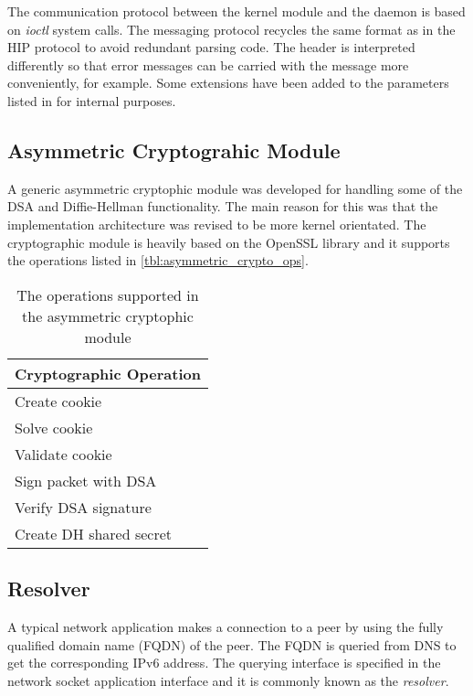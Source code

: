 The communication protocol between the kernel module and the daemon is
based on \textit{ioctl} system calls. The messaging protocol recycles
the same format as in the HIP protocol \cite{hip} to avoid redundant
parsing code. The header is interpreted differently so that error
messages can be carried with the message more conveniently, for
example. Some extensions have been added to the parameters listed in
\cite{hip} for internal purposes.

\subsection{Asymmetric Cryptograhic Module}

A generic asymmetric cryptophic module was developed for handling some
of the DSA and Diffie-Hellman functionality. The main reason for this
was that the implementation architecture was revised to be more kernel
orientated. The cryptographic module is heavily based on the OpenSSL
library and it supports the operations listed in
\autoref{tbl:asymmetric_crypto_ops}.

\begin{table}[htb]
\centering
\begin{tabular}{|l|}\hline
Cryptographic Operation \\\hline
Create cookie  \\
Solve cookie \\
Validate cookie \\
Sign packet with DSA \\
Verify DSA signature \\
Create DH shared secret \\
\hline
\end{tabular}
\caption{The operations supported in the asymmetric cryptophic module}
\label{tbl:asymmetric_crypto_ops}
\end{table}

\subsection{Resolver}
\label{sec:resolver_architecture}

A typical network application makes a connection to a peer by using
the fully qualified domain name (FQDN) of the peer. The FQDN is
queried from DNS to get the corresponding IPv6 address. The querying
interface is specified in the network socket application interface and
it is commonly known as the \textit{resolver}.

